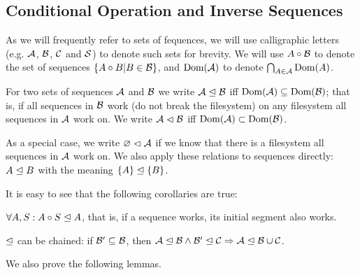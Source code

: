 

\subsection{Conditional Operation and Inverse Sequences}

\begin{mydef}
As we will frequently refer to sets of fequences,
we will use calligraphic letters (e.g. $\mathcal{A}$, $\mathcal{B}$, $\mathcal{C}$ and $\mathcal{S}$)
to denote such sets for brevity.
We will use $A\circ\mathcal{B}$ to denote the set of sequences $\{A\circ B|B\in\mathcal{B}\}$,
and $\textrm{Dom}({\mathcal{A}})$ to denote $\bigcap_{A\in\mathcal{A}} \textrm{Dom}({A})$.
\end{mydef}

\begin{mydef}[$\worksmsign$, $\worksmeqsign$]
For two sets of sequences $\mathcal{A}$ and $\mathcal{B}$
we write ${\mathcal{A}}\trianglelefteq{\mathcal{B}}$ iff $\textrm{Dom}({\mathcal{A}}) \subseteq \textrm{Dom}({\mathcal{B}})$;
that is, if all sequences in $\mathcal{B}$ work (do not break the filesystem)
on any filesystem all sequences in $\mathcal{A}$ work on.
We write ${\mathcal{A}}\vartriangleleft{\mathcal{B}}$ iff $\textrm{Dom}({\mathcal{A}}) \subset \textrm{Dom}({\mathcal{B}})$.

As a special case, we write ${\varnothing}\vartriangleleft{\mathcal{A}}$ if we know that there is a filesystem
all sequences in $\mathcal{A}$ work on.
We also apply these relations to sequences directly:
${A}\trianglelefteq{B}$ with the meaning ${\{A\}}\trianglelefteq{\{B\}}$.
\end{mydef}

It is easy to see that the following corollaries are true:

\begin{mycor}\label{worksextpostfix}
$\forall A,S: {A\circ S}\trianglelefteq{A}$, that is, if a sequence works, its initial segment also works.
\end{mycor}

\begin{mycor}\label{workschained}
$\worksmeqsign$ can be chained:
if $\mathcal{B'}\subseteq\mathcal{B}$, then
${\mathcal{A}}\trianglelefteq{\mathcal{B}} \wedge {\mathcal{B'}}\trianglelefteq{\mathcal{C}} \Rightarrow {\mathcal{A}}\trianglelefteq{\mathcal{B}\cup\mathcal{C}}$.
\end{mycor}

We also prove the following lemmas.

